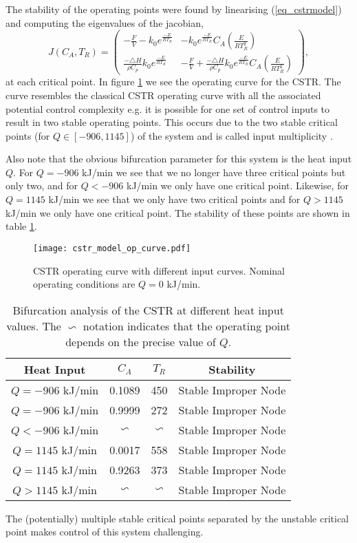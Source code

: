 The stability of the operating points were found by linearising (\ref{eq_cstrmodel}) and computing the eigenvalues of the jacobian,
\begin{equation}
J(C_A, T_R) = \begin{pmatrix}
-\frac{F}{V} - k_0e^{\frac{-E}{RT_R}} & - k_0e^{\frac{-E}{RT_R}}C_A\left(\frac{E}{RT_R^2}\right) \\
\frac{-\triangle H}{\rho C_p}k_0e^{\frac{-E}{RT_R}} & -\frac{F}{V} + \frac{-\triangle H}{\rho C_p}k_0e^{\frac{-E}{RT_R}}C_A\left(\frac{E}{RT_R^2}\right)
\end{pmatrix},
\label{eq_jacobian}
\end{equation}
at each critical point. In figure \ref{fig_cstr_op_curve} we see the operating curve for the CSTR. The curve resembles the classical CSTR operating curve with all the associated potential control complexity e.g. it is possible for one set of control inputs to result in two stable operating points. This occurs due to the two stable critical points (for $Q\in [-906, 1145]$) of the system and is called input multiplicity \cite{luyben}. 

Also note that the obvious bifurcation parameter for this system is the heat input $Q$. For $Q = -906$ kJ/min we see that we no longer have three critical points but only two, and for $Q < -906$ kJ/min we only have one critical point. Likewise, for $Q = 1145$ kJ/min we see that we only have two critical points and for $Q > 1145$ kJ/min we only have one critical point. The stability of these points are shown in table \ref{tab_bifurc}.  
\begin{figure}[H] 
\centering
\texttt{[image: cstr\_model\_op\_curve.pdf]}
\caption{CSTR operating curve with different input curves. Nominal operating conditions are $Q=0$ kJ/min.}
\label{fig_cstr_op_curve}
\end{figure}
\begin{table}[H]
\begin{center}
\begin{tabular}{c c c c}
\hline
Heat Input & $C_A$ & $T_R$ & Stability\\
\hline
$Q = -906$ kJ/min & 0.1089 & 450 & Stable Improper Node\\
$Q = -906$ kJ/min & 0.9999 & 272 & Stable Improper Node \\
\hline
$Q < -906$ kJ/min & $\backsim$ & $\backsim$ & Stable Improper Node \\
\hline
$Q = 1145$ kJ/min & 0.0017 & 558 & Stable Improper Node\\
$Q = 1145$ kJ/min & 0.9263 & 373 & Stable Improper Node \\
\hline
$Q > 1145$ kJ/min & $\backsim$ & $\backsim$ & Stable Improper Node \\
\hline
\end{tabular}
\caption{Bifurcation analysis of the CSTR at different heat input values. The $\backsim$ notation indicates that the operating point depends on the precise value of $Q$.}
\label{tab_bifurc}
\end{center}
\end{table}
The (potentially) multiple stable critical points separated by the unstable critical point makes control of this system challenging.    

